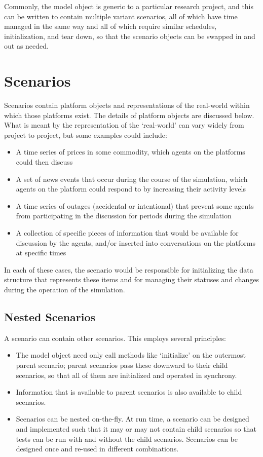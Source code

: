 Commonly, the model object is generic to a particular research project, and this can be written to contain multiple variant scenarios, all of which have time managed in the same way and all of which require similar schedules, initialization, and tear down, so that the scenario objects can be swapped in and out as needed.

\section{Scenarios}
Scenarios contain platform objects and representations of the real-world within which those platforms exist. The details of platform objects are discussed below. What is meant by the representation of the `real-world' can vary widely from project to project, but some examples could include:

\begin{itemize}
\item A time series of prices in some commodity, which agents on the platforms could then discuss
\item A set of news events that occur during the course of the simulation, which agents on the platform could respond to by increasing their activity levels
\item A time series of outages (accidental or intentional) that prevent some agents from participating in the discussion for periods during the simulation
\item A collection of specific pieces of information that would be available for discussion by the agents, and/or inserted into conversations on the platforms at specific times
\end{itemize}

In each of these cases, the scenario would be responsible for initializing the data structure that represents these items and for managing their statuses and changes during the operation of the simulation.

\subsection{Nested Scenarios}
A scenario can contain other scenarios. This employs several principles:

\begin{itemize}
\item The model object need only call methods like `initialize' on the outermost parent scenario; parent scenarios pass these downward to their child scenarios, so that all of them are initialized and operated in synchrony.
\item Information that is available to parent scenarios is also available to child scenarios.
\item Scenarios can be nested on-the-fly. At run time, a scenario can be designed and implemented such that it may or may not contain child scenarios so that tests can be run with and without the child scenarios. Scenarios can be designed once and re-used in different combinations.
\end{itemize}

